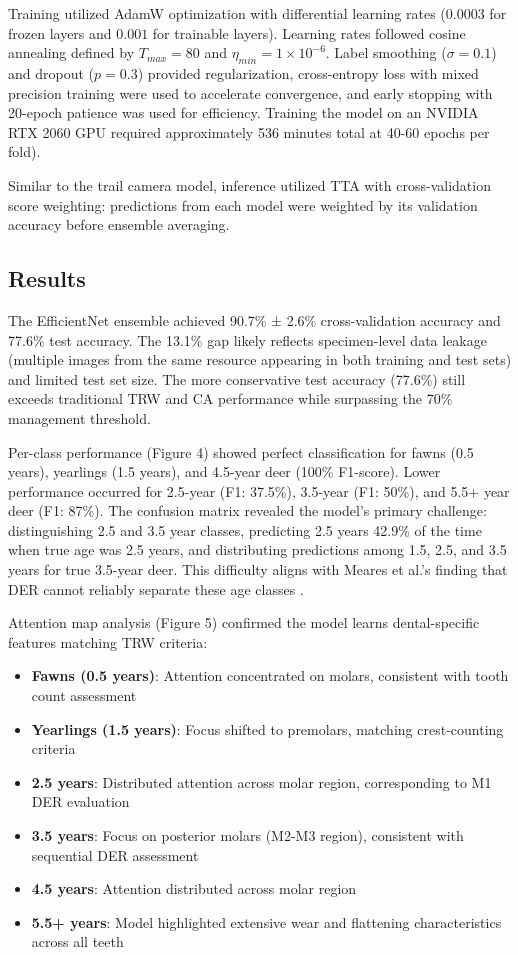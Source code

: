 \documentclass{iopjournal}
\begin{document}
Training utilized AdamW optimization with differential learning rates ($0.0003$ for frozen layers and $0.001$ for trainable layers). Learning rates followed cosine annealing defined by $T_{max}=80$ and $η_{min}=1\times10^{-6}$. Label smoothing ($\sigma=0.1$) and dropout ($p=0.3$) provided regularization, cross-entropy loss with mixed precision training were used to accelerate convergence, and early stopping with 20-epoch patience was used for efficiency. Training the model on an NVIDIA RTX 2060 GPU required approximately 536 minutes total at 40-60 epochs per fold).

Similar to the trail camera model, inference utilized TTA with cross-validation score weighting: predictions from each model were weighted by its validation accuracy before ensemble averaging.

\subsection{Results}

The EfficientNet ensemble achieved 90.7\% ± 2.6\% cross-validation accuracy and 77.6\% test accuracy. The 13.1\% gap likely reflects specimen-level data leakage (multiple images from the same resource appearing in both training and test sets) and limited test set size. The more conservative test accuracy (77.6\%) still exceeds traditional TRW and CA performance while surpassing the 70\% management threshold.

Per-class performance (Figure 4) showed perfect classification for fawns (0.5 years), yearlings (1.5 years), and 4.5-year deer (100\% F1-score). Lower performance occurred for 2.5-year (F1: 37.5\%), 3.5-year (F1: 50\%), and 5.5+ year deer (F1: 87\%). The confusion matrix revealed the model's primary challenge: distinguishing 2.5 and 3.5 year classes, predicting 2.5 years 42.9\% of the time when true age was 2.5 years, and distributing predictions among 1.5, 2.5, and 3.5 years for true 3.5-year deer. This difficulty aligns with Meares et al.'s finding that DER cannot reliably separate these age classes \cite{meares2006quantitative}.

Attention map analysis (Figure 5) confirmed the model learns dental-specific features matching TRW criteria:
\begin{itemize}
    \item \textbf{Fawns (0.5 years)}: Attention concentrated on molars, consistent with tooth count assessment
    \item \textbf{Yearlings (1.5 years)}: Focus shifted to premolars, matching crest-counting criteria  
    \item \textbf{2.5 years}: Distributed attention across molar region, corresponding to M1 DER evaluation
    \item \textbf{3.5 years}: Focus on posterior molars (M2-M3 region), consistent with sequential DER assessment
    \item \textbf{4.5 years}: Attention distributed across molar region
    \item \textbf{5.5+ years}: Model highlighted extensive wear and flattening characteristics across all teeth
\end{itemize}
\end{document}

